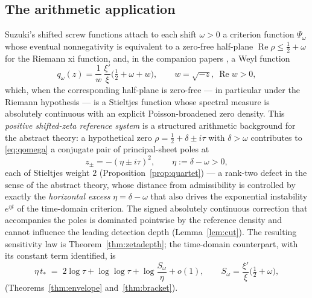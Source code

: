 \documentclass[11pt]{amsart}
\theoremstyle{definition}
\theoremstyle{remark}
\DeclareMathOperator{\Rea}{Re}
\begin{document}
\subsection{The arithmetic application}
Suzuki's shifted screw functions \cite{Suzuki2023} attach to each shift
$\omega>0$ a criterion function $\Psi_\omega$ whose eventual nonnegativity is
equivalent to a zero-free half-plane
$\Rea\rho\le\tfrac12+\omega$ for the Riemann xi function, and, in the
companion papers \cite{MarginPaper,StringPaper}, a Weyl function
\begin{equation}\label{eq:qomega}
q_\omega(z)=\frac1{w}\,\frac{\xi'}{\xi}\Big(\tfrac12+\omega+w\Big),
\qquad w=\sqrt{-z},\ \Rea w>0 ,
\end{equation}
which, when the corresponding half-plane is zero-free --- in particular under
the Riemann hypothesis --- is a Stieltjes function whose spectral measure is
absolutely continuous with an explicit Poisson-broadened zero density. This
\emph{positive shifted-zeta reference system} is a structured arithmetic
background for the abstract theory: a hypothetical zero
$\rho=\tfrac12+\delta\pm i\tau$ with $\delta>\omega$ contributes to
\eqref{eq:qomega} a conjugate pair of principal-sheet poles at
\[
z_\pm=-(\eta\pm i\tau)^2,\qquad \eta:=\delta-\omega>0,
\]
each of Stieltjes weight $2$ (Proposition~\ref{prop:quartet}) --- a rank-two
defect in the sense of the abstract theory, whose distance from admissibility
is controlled by exactly the \emph{horizontal excess} $\eta=\delta-\omega$
that also drives the exponential instability
$e^{\eta t}$ of the time-domain criterion. The signed absolutely continuous
correction that accompanies the poles is dominated pointwise by the reference
density and cannot influence the leading detection depth
(Lemma~\ref{lem:cut}). The resulting sensitivity law is
Theorem~\ref{thm:zetadepth}; the time-domain counterpart, with its constant
term identified, is
\begin{equation}\label{eq:introtime}
\eta\,t_* \;=\; 2\log\tau+\log\log\tau+\log\frac{S_\omega}{\eta}+o(1),
\qquad
S_\omega=\frac{\xi'}{\xi}\Big(\tfrac12+\omega\Big),
\end{equation}
(Theorems~\ref{thm:envelope} and~\ref{thm:bracket}).
\end{document}
